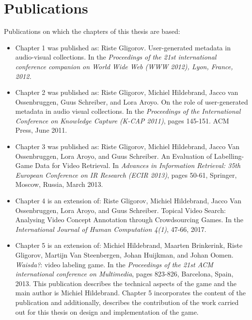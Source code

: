 \section{Publications}
Publications on which the chapters of this thesis are based:
\begin{itemize}
	\item Chapter 1 was published as: Riste Gligorov. User-generated metadata in audio-visual collections. In the \textit{Proceedings of the 21st international conference companion on World Wide Web (WWW 2012), Lyon, France, 2012.}
	\item Chapter 2 was published as: Riste Gligorov, Michiel Hildebrand, Jacco van Ossenbruggen, Guus Schreiber, and Lora Aroyo. On the role of user-generated metadata in audio visual collections. In the \textit{Proceedings of the International Conference on Knowledge Capture (K-CAP 2011)}, pages 145-151. ACM Press, June 2011.
	\item Chapter 3 was published as: Riste Gligorov, Michiel Hildebrand, Jacco Van Ossenbruggen, Lora Aroyo, and Guus Schreiber. An Evaluation of Labelling-Game Data for Video Retrieval. In \textit{Advances in Information Retrieval: 35th European Conference on IR Research (ECIR 2013)}, pages 50-61, Springer, Moscow, Russia, March 2013.
	\item Chapter 4 is an extension of: Riste Gligorov, Michiel Hildebrand, Jacco Van Ossenbruggen, Lora Aroyo, and Guus Schreiber. Topical Video Search: Analysing Video Concept Annotation through Crowdsourcing Games. In the \textit{International Journal of Human Computation 4(1)}, 47-66, 2017.
	\item Chapter 5 is an extension of: Michiel Hildebrand, Maarten Brinkerink, Riste Gligorov, Martijn Van Steenbergen, Johan Huijkman, and Johan Oomen. \textit{Waisda?}: video labeling game. In the \textit{Proceedings of the 21st ACM international conference on Multimedia}, pages 823-826, Barcelona, Spain, 2013. This publication describes the technical aspects of the game and the main author is Michiel Hildebrand. Chapter 5 incorporates the content of the publication and additionally, describes the contribution of the work carried out for this thesis on design and implementation of the game. 
	
\end{itemize}

